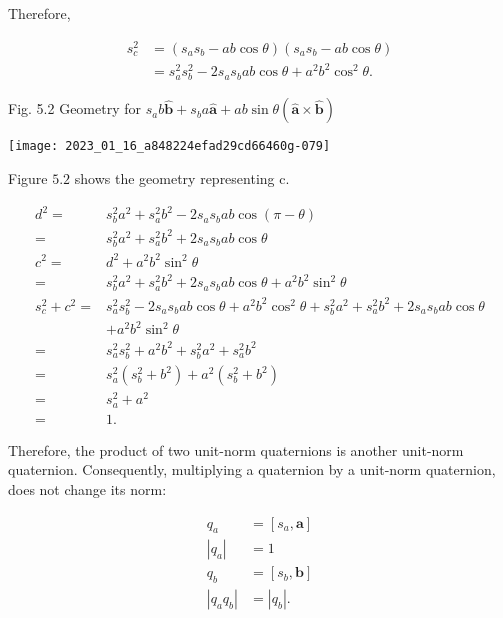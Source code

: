 Therefore,

$$
\begin{aligned}
s_{c}^{2} & =\left(s_{a} s_{b}-a b \cos \theta\right)\left(s_{a} s_{b}-a b \cos \theta\right) \\
& =s_{a}^{2} s_{b}^{2}-2 s_{a} s_{b} a b \cos \theta+a^{2} b^{2} \cos ^{2} \theta .
\end{aligned}
$$

Fig. 5.2 Geometry for $s_{a} b \hat{\mathbf{b}}+s_{b} a \hat{\mathbf{a}}+a b \sin \theta(\hat{\mathbf{a}} \times \hat{\mathbf{b}})$

\begin{center}
\texttt{[image: 2023\_01\_16\_a848224efad29cd66460g-079]}
\end{center}

Figure $5.2$ shows the geometry representing c.

$$
\begin{aligned}
d^{2}= & s_{b}^{2} a^{2}+s_{a}^{2} b^{2}-2 s_{a} s_{b} a b \cos (\pi-\theta) \\
= & s_{b}^{2} a^{2}+s_{a}^{2} b^{2}+2 s_{a} s_{b} a b \cos \theta \\
c^{2}= & d^{2}+a^{2} b^{2} \sin ^{2} \theta \\
= & s_{b}^{2} a^{2}+s_{a}^{2} b^{2}+2 s_{a} s_{b} a b \cos \theta+a^{2} b^{2} \sin ^{2} \theta \\
s_{c}^{2}+c^{2}= & s_{a}^{2} s_{b}^{2}-2 s_{a} s_{b} a b \cos \theta+a^{2} b^{2} \cos ^{2} \theta+s_{b}^{2} a^{2}+s_{a}^{2} b^{2}+2 s_{a} s_{b} a b \cos \theta \\
& +a^{2} b^{2} \sin ^{2} \theta \\
= & s_{a}^{2} s_{b}^{2}+a^{2} b^{2}+s_{b}^{2} a^{2}+s_{a}^{2} b^{2} \\
= & s_{a}^{2}\left(s_{b}^{2}+b^{2}\right)+a^{2}\left(s_{b}^{2}+b^{2}\right) \\
= & s_{a}^{2}+a^{2} \\
= & 1 .
\end{aligned}
$$

Therefore, the product of two unit-norm quaternions is another unit-norm quaternion. Consequently, multiplying a quaternion by a unit-norm quaternion, does not change its norm:

$$
\begin{aligned}
q_{a} & =\left[s_{a}, \mathbf{a}\right] \\
\left|q_{a}\right| & =1 \\
q_{b} & =\left[s_{b}, \mathbf{b}\right] \\
\left|q_{a} q_{b}\right| & =\left|q_{b}\right| .
\end{aligned}
$$

